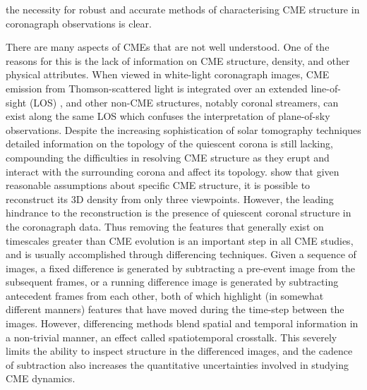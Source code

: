 \documentclass[namedreferences]{SolarPhysics}
\begin{document}
\begin{article}
the necessity for robust and accurate methods of characterising CME structure in coronagraph observations is clear.

There are many aspects of CMEs that are not well understood. One of the reasons for this is the lack of information on CME structure, density, and other physical attributes. When viewed in white-light coronagraph images, CME emission from Thomson-scattered light is integrated over an extended line-of-sight (LOS) \citep[for details see][]{2009SSRv..147...31H}, and other non-CME structures, notably coronal streamers, can exist along the same LOS which confuses the interpretation of plane-of-sky observations. Despite the increasing sophistication of solar tomography techniques \citep[see][and references therein]{2009ApJ...690.1119M, 2010ApJ...710....1M} detailed information on the topology of the quiescent corona is still lacking, compounding the difficulties in resolving CME structure as they erupt and interact with the surrounding corona and affect its topology. \citet{2009ApJ...695..636F} show that given reasonable assumptions about specific CME structure, it is possible to reconstruct its 3D density from only three viewpoints. However, the leading hindrance to the reconstruction is the presence of quiescent coronal structure in the coronagraph data. Thus removing the features that generally exist on timescales greater than CME evolution is an important step in all CME studies, and is usually accomplished through differencing techniques. Given a sequence of images, a fixed difference is generated by subtracting a pre-event image from the subsequent frames, or a running difference image is generated by subtracting antecedent frames from each other, both of which highlight (in somewhat different manners) features that have moved during the time-step between the images. However, differencing methods blend spatial and temporal information in a non-trivial manner, an effect called spatiotemporal crosstalk. This severely limits the ability to inspect structure in the differenced images, and the cadence of subtraction also increases the quantitative uncertainties involved in studying CME dynamics.


\end{article}
\end{document}

